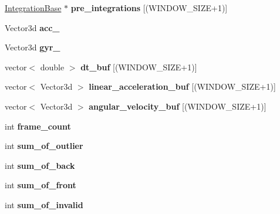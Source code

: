\begin{DoxyCompactItemize}
\mbox{\label{classEstimator_ad4eda10e539c70aa084b2c12b3f2a91e}} 
\hyperlink{classIntegrationBase}{Integration\+Base} $\ast$ {\bfseries pre\+\_\+integrations} \mbox{[}(W\+I\+N\+D\+O\+W\+\_\+\+S\+I\+ZE+1)\mbox{]}
\item 
\mbox{\label{classEstimator_aaf838ba54ec51344bdb46ab8fed5a31a}} 
Vector3d {\bfseries acc\+\_}
\item 
\mbox{\label{classEstimator_ab100397542d96248fd4e96cdcb5c7b6a}} 
Vector3d {\bfseries gyr\+\_}
\item 
\mbox{\label{classEstimator_a844443a999600e2627f7486ea28a5eb6}} 
vector$<$ double $>$ {\bfseries dt\+\_\+buf} \mbox{[}(W\+I\+N\+D\+O\+W\+\_\+\+S\+I\+ZE+1)\mbox{]}
\item 
\mbox{\label{classEstimator_aaae7dad254aba40dc261f29ae985fa9d}} 
vector$<$ Vector3d $>$ {\bfseries linear\+\_\+acceleration\+\_\+buf} \mbox{[}(W\+I\+N\+D\+O\+W\+\_\+\+S\+I\+ZE+1)\mbox{]}
\item 
\mbox{\label{classEstimator_a653b46f9a739aa16ab0d2da59b747ba1}} 
vector$<$ Vector3d $>$ {\bfseries angular\+\_\+velocity\+\_\+buf} \mbox{[}(W\+I\+N\+D\+O\+W\+\_\+\+S\+I\+ZE+1)\mbox{]}
\item 
\mbox{\label{classEstimator_add0682c516a2c046091eb78fb66a074b}} 
int {\bfseries frame\+\_\+count}
\item 
\mbox{\label{classEstimator_a687dfa6523f8b161a58d364981fc89d6}} 
int {\bfseries sum\+\_\+of\+\_\+outlier}
\item 
\mbox{\label{classEstimator_a9373c8ca8fa2f85429c533a9e962cac9}} 
int {\bfseries sum\+\_\+of\+\_\+back}
\item 
\mbox{\label{classEstimator_a116e4d7566f6085634a1b584a969e1d6}} 
int {\bfseries sum\+\_\+of\+\_\+front}
\item 
\mbox{\label{classEstimator_a995855d093897b972fc2f6197c4691be}} 
int {\bfseries sum\+\_\+of\+\_\+invalid}

\end{DoxyCompactItemize}
